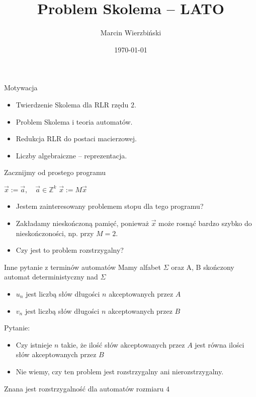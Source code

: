 \documentclass[handout]{beamer}
\title{Problem Skolema -- LATO}
\author{Marcin Wierzbiński}
\institute{MIMUW}
\date{\today}
\def\Z{\mathbb Z}
\theoremstyle{definition}
\theoremstyle{named}
\begin{document}
\frame{\titlepage}

\begin{frame}{Motywacja}
\begin{itemize}
    \item Twierdzenie Skolema dla RLR rzędu $2$.
    \item Problem Skolema i teoria automatów.
    \item Redukcja RLR do postaci macierzowej.
    \item Liczby algebraiczne -- reprezentacja.
\end{itemize}
\end{frame}

\begin{frame}{Zacznijmy od prostego programu}
    \begin{algorithm}[H] 
        \begin{algorithmic}[l]
        \State $\vec{x} := \vec{a}, \quad \vec{a} \in \Z^{k}$  
          \State $\vec{x} := M \vec{x}$ \algorithmiccomment{$M \in \Z^{k \times k}$}
          
        \EndWhile
        \end{algorithmic}
    \end{algorithm}
    
    \begin{itemize}
    \pause 
    \item Jestem zainteresowany problemem stopu dla tego programu? 
    
    
    \item  Zakładamy nieskończoną pamięć, ponieważ $\vec{x}$ może rosnąć bardzo szybko do nieskończoności, np. przy $M=2$.
    \pause
    
    \item  Czy jest to problem rozstrzygalny?
    \end{itemize}

\end{frame}


\begin{frame}{Inne pytanie z terminów automatów}
    Mamy alfabet $\Sigma$  oraz A, B skończony automat deterministyczny nad $\Sigma$
    \begin{itemize}
        \item $u_n$ jest liczbą słów długości $n$ akceptowanych przez $A$
        \item  $v_n$ jest liczbą słów długości $n$ akceptowanych przez $B$

    \end{itemize}
    Pytanie:
    \begin{itemize}
        \item  Czy istnieje $n$ takie, że ilość słów akceptowanych przez $A$ jest równa ilości słów akceptowanych przez $B$ 
        \item  Nie wiemy, czy ten problem jest rozstrzygalny ani nierozstrzygalny. 
    \end{itemize}
    \pause
    
    Znana jest rozstrzygalność dla automatów rozmiaru $4$

\end{frame}
\end{document}
